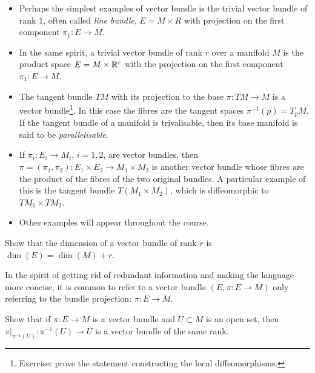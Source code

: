 \begin{example}
  \begin{itemize}
    \item Perhaps the simplest examples of vector bundle is the trivial vector bundle of rank $1$, often called \emph{line bundle}, $E = M \times R$ with projection on the first component $\pi_1: E \to M$.
    \item In the same spirit, a trivial vector bundle of rank $r$ over a manifold $M$ is the product space $E = M\times \mathbb{R}^r$ with the projection on the first component $\pi_1: E\to M$.
    \item The tangent bundle $TM$ with its projection to the base $\pi:TM\to M$ is a vector bundle\footnote{Exercise: prove the statement constructing the local diffeomorphisms.}.
          In this case the fibres are the tangent spaces $\pi^{-1}(p) = T_pM$.
          If the tangent bundle of a manifold is trivalisable, then its base manifold is said to be \emph{parallelisable}.
    \item If $\pi_i: E_i\to M_i$, $i=1,2$, are vector bundles, then $\pi = (\pi_1, \pi_2): E_1\times E_2 \to M_1\times M_2$ is another vector bundle whose fibres are the product of the fibres of the two original bundles.
          A particular example of this is the tangent bundle $T(M_1\times M_2)$, which is diffeomorphic to $TM_1 \times TM_2$.
    \item Other examples will appear throughout the course.
  \end{itemize}
\end{example}

\begin{exercise}
  Show that the dimension of a vector bundle of rank $r$ is $\dim(E) = \dim(M) + r$.
\end{exercise}

\begin{remark}
  In the spirit of getting rid of redundant information and making the language more concise, it is common to refer to a vector bundle $(E, \pi : E \to M)$ only referring to the bundle projection: $\pi : E \to M$.
\end{remark}

\begin{exercise}
  Show that if $\pi:E\to M$ is a vector bundle and $U\subset M$ is an open set, then $\pi\big|_{\pi^{-1}(U)}: \pi^{-1}(U) \to U$ is a vector bundle of the same rank.
\end{exercise}

